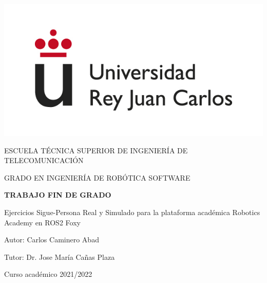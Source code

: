 \thispagestyle{empty}

\begin{titlepage}
	\begin{center}
		\vspace*{3mm}
		\begin{center}
			\includegraphics[width=0.4\linewidth]{imagenes/logo.jpg}
		\end{center}
		\vspace{6.0mm}
		
		\fontsize{15.5}{14}\selectfont ESCUELA TÉCNICA SUPERIOR DE INGENIERÍA DE TELECOMUNICACIÓN
		\vspace{13mm}
		
		\fontsize{14}{14}\selectfont GRADO EN INGENIERÍA DE ROBÓTICA SOFTWARE
		
		\vspace{70pt}
		
		\fontsize{15.7}{14}\selectfont \textbf{TRABAJO FIN DE GRADO} 
		
		\vspace{20mm}
		\begin{LARGE}
			Ejercicios Sigue-Persona Real y Simulado para la plataforma académica Robotics Academy en ROS2 Foxy
		\end{LARGE}
		
		\vspace{20mm}
		
		\begin{large}
			Autor: Carlos Caminero Abad
			
			Tutor: Dr. Jose María Cañas Plaza
			
			\vspace{10mm}
		\end{large}
		\begin{normalsize}
			Curso académico 2021/2022		
		\end{normalsize}
		\vspace{10mm}
		
	\end{center}
	
\end{titlepage}

\thispagestyle{empty}